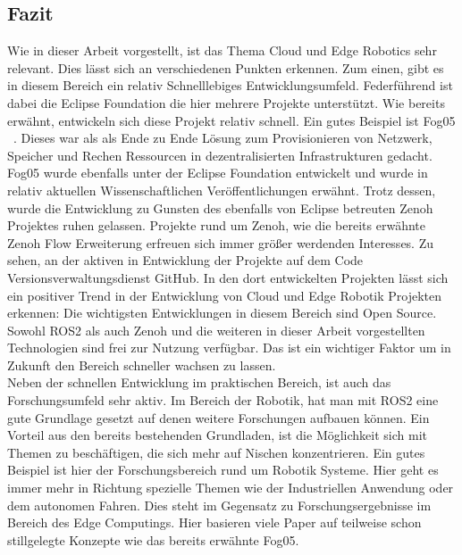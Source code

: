 

\subsection{Fazit} %
\label{sub:Fazit}

Wie in dieser Arbeit vorgestellt, ist das Thema Cloud und Edge Robotics sehr relevant. Dies lässt sich an verschiedenen Punkten erkennen. Zum einen, gibt es in diesem Bereich ein relativ Schnelllebiges Entwicklungsumfeld. Federführend ist dabei die Eclipse Foundation die hier mehrere Projekte unterstützt. Wie bereits erwähnt, entwickeln sich diese Projekt relativ schnell. Ein gutes Beispiel ist Fog05 ~\cite{EclipseFog052022}. Dieses war als als Ende zu Ende Lösung zum Provisionieren von Netzwerk, Speicher und Rechen Ressourcen in dezentralisierten Infrastrukturen gedacht\cite{corsaroFogO5UnifyingComputing2018}. Fog05 wurde ebenfalls unter der Eclipse Foundation entwickelt und wurde in relativ aktuellen Wissenschaftlichen Veröffentlichungen erwähnt. Trotz dessen, wurde die Entwicklung zu Gunsten des ebenfalls von Eclipse betreuten Zenoh Projektes ruhen gelassen. Projekte rund um Zenoh, wie die bereits erwähnte Zenoh Flow Erweiterung erfreuen sich immer größer werdenden Interesses. Zu sehen, an der aktiven in Entwicklung der Projekte auf dem Code Versionsverwaltungsdienst GitHub. In den dort entwickelten Projekten lässt sich ein positiver Trend in der Entwicklung von Cloud und Edge Robotik Projekten erkennen: Die wichtigsten Entwicklungen in diesem Bereich sind Open Source. Sowohl ROS2 als auch Zenoh und die weiteren in dieser Arbeit vorgestellten Technologien sind frei zur Nutzung verfügbar. Das ist ein wichtiger Faktor um in Zukunft den Bereich schneller wachsen zu lassen.\\

Neben der schnellen Entwicklung im praktischen Bereich, ist auch das Forschungsumfeld sehr aktiv. Im Bereich der Robotik, hat man mit ROS2 eine gute Grundlage gesetzt auf denen weitere Forschungen aufbauen können. Ein Vorteil aus den bereits bestehenden Grundladen, ist die Möglichkeit sich mit Themen zu beschäftigen, die sich mehr auf Nischen konzentrieren. Ein gutes Beispiel ist hier der Forschungsbereich rund um Robotik Systeme. Hier geht es immer mehr in Richtung spezielle Themen wie der Industriellen Anwendung oder dem autonomen Fahren. Dies steht im Gegensatz zu Forschungsergebnisse im Bereich des Edge Computings. Hier basieren viele Paper auf teilweise schon stillgelegte Konzepte wie das bereits erwähnte Fog05.\\

